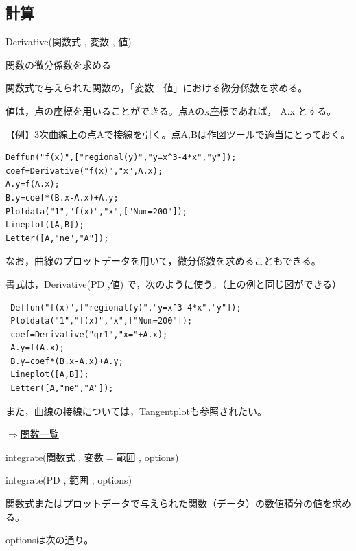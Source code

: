 \documentclass[papersize,a4paper,10pt,uplatex]{jsarticle}
\begin{document}
\subsection{計算}

\begin{description}

\hypertarget{derivative}{}
\item[関数]Derivative(関数式 , 変数 , 値)
\item[機能]関数の微分係数を求める
\item[説明]関数式で与えられた関数の，「変数＝値」における微分係数を求める。

値は，点の座標を用いることができる。点Aのx座標であれば， A.x とする。

\vspace{\baselineskip}
【例】3次曲線上の点Aで接線を引く。点A,Bは作図ツールで適当にとっておく。
\begin{verbatim}
Deffun("f(x)",["regional(y)","y=x^3-4*x","y"]);
coef=Derivative("f(x)","x",A.x);
A.y=f(A.x);
B.y=coef*(B.x-A.x)+A.y;
Plotdata("1","f(x)","x",["Num=200"]);
Lineplot([A,B]);
Letter([A,"ne","A"]);
\end{verbatim}
\begin{center}  \end{center}


なお，曲線のプロットデータを用いて，微分係数を求めることもできる。

書式は，Derivative(PD ,値) で，次のように使う。（上の例と同じ図ができる）

\begin{verbatim}
 Deffun("f(x)",["regional(y)","y=x^3-4*x","y"]);
 Plotdata("1","f(x)","x",["Num=200"]);
 coef=Derivative("gr1","x="+A.x);
 A.y=f(A.x);
 B.y=coef*(B.x-A.x)+A.y;
 Lineplot([A,B]);
 Letter([A,"ne","A"]);
\end{verbatim}

また，曲線の接線については，\hyperlink{tangentplot}{Tangentplot}も参照されたい。

\begin{flushright}\hyperlink{functionlist}{$\Rightarrow$関数一覧}\end{flushright}

\vspace{\baselineskip}
\hypertarget{integrate}{}
\item[関数]integrate(関数式 , 変数$=$範囲 , options)
\item[関数]integrate(PD , 範囲 , options)
\item[機能]関数式またはプロットデータで与えられた関数（データ）の数値積分の値を求める。
\item[説明]optionsは次の通り。


\end{description}
\end{document}
